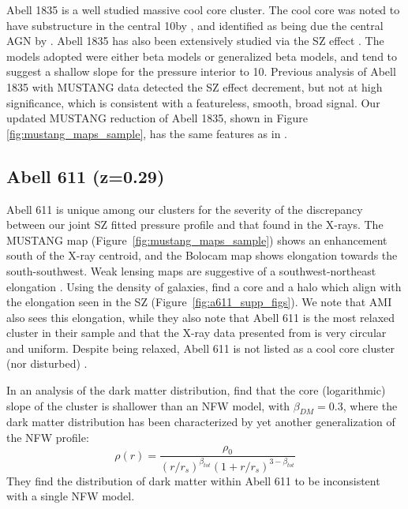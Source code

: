 \documentclass[iop,numberedappendix,apj]{emulateapj}
\begin{document}

Abell 1835 is a well studied massive cool core cluster. The cool core was noted to have substructure in the central
10\asecs by \citet{schmidt2001}, and identified as being due the central AGN by \citet{mcnamara2006}. Abell 1835 has also
been extensively studied via the SZ effect \citep{reese2002,benson2004,bonamente2006,sayers2011,mauskopf2012}. The models adopted
were either beta models or generalized beta models, and tend to suggest a shallow slope for the pressure interior
to 10\asec. Previous analysis of Abell 1835 with MUSTANG data \citep{korngut2011} detected the SZ effect decrement, but not
at high significance, which is consistent with a featureless, smooth, broad signal. Our updated MUSTANG reduction
of Abell 1835, shown in Figure \ref{fig:mustang_maps_sample}, has the same features as in \citet{korngut2011}.


\subsection{Abell 611 (z=0.29)}
\label{sec:results_a611}


Abell 611 is unique among our clusters for the severity of the discrepancy between our joint SZ fitted pressure
profile and that found in the X-rays. The MUSTANG map (Figure~\ref{fig:mustang_maps_sample}) shows an enhancement
south of the X-ray centroid, and the Bolocam map shows elongation towards the south-southwest. Weak lensing maps
are suggestive of a southwest-northeast elongation \citep{newman2009, zitrin2015}.
Using the density of galaxies, \citet{lemze2013} find a core and a halo which align with the elongation seen 
in the SZ (Figure~\ref{fig:a611_supp_figs}). We note that AMI
\citep{hurley-walker2012} also sees this elongation, while they also note that Abell 611 is the most relaxed
cluster in their sample and that the X-ray data presented from \citet{laroque2006} is very circular and uniform.
Despite being relaxed, Abell 611 is not listed as a cool core cluster (nor disturbed) \citep{sayers2013}.

In an analysis of the dark matter distribution, \citet{newman2009} find that the core (logarithmic) slope of the
cluster is shallower than an NFW model, with $\beta_{DM} = 0.3$, where the dark matter distribution has been characterized
by yet another generalization of the NFW profile:
\begin{equation}
  \rho(r) = \frac{\rho_0}{(r/r_s)^{\beta_{tot}}(1 + r/r_s)^{3-\beta_{tot}}}
\end{equation}
They find the distribution of dark matter within Abell 611 to be inconsistent with a single NFW model. 
\end{document}
